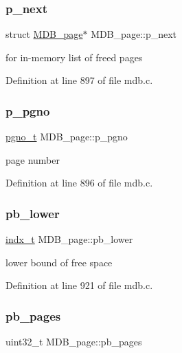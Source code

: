 \subsubsection{\texorpdfstring{p\+\_\+next}{p\_next}}
{\footnotesize\ttfamily struct \mbox{\hyperlink{struct_m_d_b__page}{M\+D\+B\+\_\+page}}$\ast$ M\+D\+B\+\_\+page\+::p\+\_\+next}

for in-\/memory list of freed pages 

Definition at line 897 of file mdb.\+c.

\mbox{\label{struct_m_d_b__page_a6843bdabaf55bcabe210d81df5cd80fb}} 
\subsubsection{\texorpdfstring{p\+\_\+pgno}{p\_pgno}}
{\footnotesize\ttfamily \mbox{\hyperlink{group__internal_gadb65f0424c9d3827bf6409087ad555cd}{pgno\+\_\+t}} M\+D\+B\+\_\+page\+::p\+\_\+pgno}

page number 

Definition at line 896 of file mdb.\+c.

\mbox{\label{struct_m_d_b__page_aae5a99c09df21f2cc03bea30ded4cf77}} 
\subsubsection{\texorpdfstring{pb\+\_\+lower}{pb\_lower}}
{\footnotesize\ttfamily \mbox{\hyperlink{group__internal_ga730e17f748208d77496ebd895c8375dc}{indx\+\_\+t}} M\+D\+B\+\_\+page\+::pb\+\_\+lower}

lower bound of free space 

Definition at line 921 of file mdb.\+c.

\mbox{\label{struct_m_d_b__page_a85165930b6c7036e9b570fc86a5f4ace}} 
\subsubsection{\texorpdfstring{pb\+\_\+pages}{pb\_pages}}
{\footnotesize\ttfamily uint32\+\_\+t M\+D\+B\+\_\+page\+::pb\+\_\+pages}

